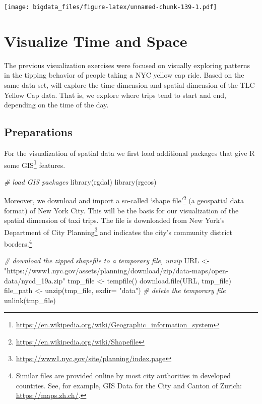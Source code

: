 \documentclass[
  12pt,
]{style/krantz}
\newenvironment{Shaded}{\begin{snugshade}}{\end{snugshade}}
\newcommand{\AttributeTok}[1]{\textcolor[rgb]{0.77,0.63,0.00}{#1}}
\newcommand{\CommentTok}[1]{\textcolor[rgb]{0.56,0.35,0.01}{\textit{#1}}}
\newcommand{\FunctionTok}[1]{\textcolor[rgb]{0.00,0.00,0.00}{#1}}
\newcommand{\NormalTok}[1]{#1}
\newcommand{\OtherTok}[1]{\textcolor[rgb]{0.56,0.35,0.01}{#1}}
\newcommand{\StringTok}[1]{\textcolor[rgb]{0.31,0.60,0.02}{#1}}
\renewcommand{\href}[2]{#2\footnote{\url{#1}}}
\begin{document}
\texttt{[image: bigdata\_files/figure-latex/unnamed-chunk-139-1.pdf]}

\hypertarget{visualize-time-and-space}{%
\section{Visualize Time and Space}\label{visualize-time-and-space}}

The previous visualization exercises were focused on visually exploring patterns in the tipping behavior of people taking a NYC yellow cap ride. Based on the same data set, will explore the time dimension and spatial dimension of the TLC Yellow Cap data. That is, we explore where trips tend to start and end, depending on the time of the day.

\hypertarget{preparations}{%
\subsection{Preparations}\label{preparations}}

For the visualization of spatial data we first load additional packages that give R some \href{https://en.wikipedia.org/wiki/Geographic_information_system}{GIS} features.

\begin{Shaded}
\begin{Highlighting}[]
\CommentTok{\# load GIS packages}
\FunctionTok{library}\NormalTok{(rgdal)}
\FunctionTok{library}\NormalTok{(rgeos)}
\end{Highlighting}
\end{Shaded}

Moreover, we download and import a so-called \href{https://en.wikipedia.org/wiki/Shapefile}{`shape file'} (a geospatial data format) of New York City. This will be the basis for our visualization of the spatial dimension of taxi trips. The file is downloaded from \href{https://www1.nyc.gov/site/planning/index.page}{New York's Department of City Planning} and indicates the city's community district borders.\footnote{Similar files are provided online by most city authorities in developed countries. See, for example, GIS Data for the City and Canton of Zurich: \url{https://maps.zh.ch/}.}

\begin{Shaded}
\begin{Highlighting}[]
\CommentTok{\# download the zipped shapefile to a temporary file, unzip}
\NormalTok{URL }\OtherTok{\textless{}{-}} \StringTok{"https://www1.nyc.gov/assets/planning/download/zip/data{-}maps/open{-}data/nycd\_19a.zip"}
\NormalTok{tmp\_file }\OtherTok{\textless{}{-}} \FunctionTok{tempfile}\NormalTok{()}
\FunctionTok{download.file}\NormalTok{(URL, tmp\_file)}
\NormalTok{file\_path }\OtherTok{\textless{}{-}} \FunctionTok{unzip}\NormalTok{(tmp\_file, }\AttributeTok{exdir=} \StringTok{"data"}\NormalTok{)}
\CommentTok{\# delete the temporary file}
\FunctionTok{unlink}\NormalTok{(tmp\_file)}
\end{Highlighting}
\end{Shaded}
\end{document}
